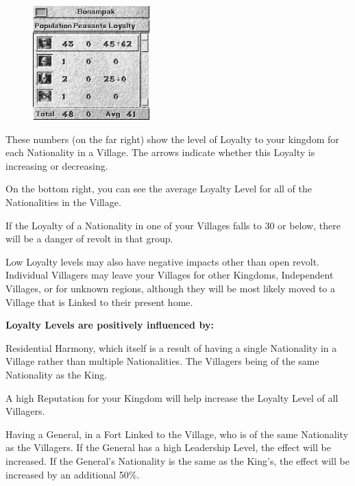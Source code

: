 \begin{figure}
    \vspace{-20pt}
    \begin{center}
        \includegraphics[width=0.4\textwidth]{Ivillage_peasants} %
    \end{center}
    \vspace{-20pt}
\end{figure}

These numbers (on the far right) show the level of Loyalty to your kingdom for each Nationality in a Village. The arrows indicate whether this Loyalty is increasing or decreasing.

On the bottom right, you can see the average Loyalty Level for all of the Nationalities in the Village.

If the Loyalty of a Nationality in one of your Villages falls to 30 or below, there will be a danger of revolt in that group.


Low Loyalty levels may also have negative impacts other than open revolt. Individual Villagers may leave your Villages for other Kingdoms, Independent Villages, or for unknown regions, although they will be most likely moved to a Village that is Linked to their present home.


\textbf{Loyalty Levels are positively influenced by:}


\begin{changemargin}{.5cm}{0cm}
Residential Harmony, which itself is a result of having a single Nationality in a Village rather than multiple Nationalities. The Villagers being of the same Nationality as the King.

A high Reputation for your Kingdom will help increase the Loyalty Level of all Villagers.

Having a General, in a Fort Linked to the Village, who is of the same Nationality as the Villagers. If the General has a high Leadership Level, the effect will be increased. If the General’s Nationality is the same as the King’s, the effect will be increased by an additional 50\%.
\end{changemargin}

